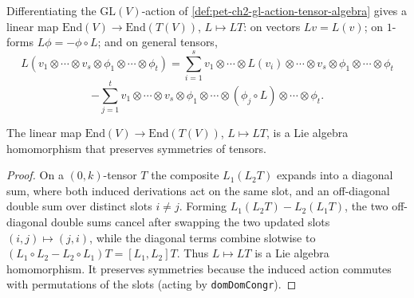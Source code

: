 \begin{definition}
  \label{def:pet-ch2-endomorphism-derivation}
  \leanok
  Differentiating the $\mathrm{GL}(V)$-action of
  \cref{def:pet-ch2-gl-action-tensor-algebra} gives a linear map
  $\mathrm{End}(V)\to\mathrm{End}(T(V))$, $L\mapsto LT$: on vectors $Lv=L(v)$;
  on $1$-forms $L\phi=-\phi\circ L$; and on general tensors,
  \[
    L(v_1\otimes\cdots\otimes v_s\otimes\phi_1\otimes\cdots\otimes\phi_t)
    = \sum_{i=1}^sv_1\otimes\cdots\otimes L(v_i)\otimes\cdots\otimes v_s\otimes\phi_1\otimes\cdots\otimes\phi_t
  \]
  \[
    -\sum_{j=1}^tv_1\otimes\cdots\otimes v_s\otimes\phi_1\otimes\cdots\otimes(\phi_j\circ L)\otimes\cdots\otimes\phi_t.
  \]
\end{definition}

\begin{proposition}
  \label{prop:pet-ch2-endomorphism-lie-algebra-hom}
  \leanok
  The linear map $\mathrm{End}(V)\to\mathrm{End}(T(V))$, $L\mapsto LT$, is a
  Lie algebra homomorphism that preserves symmetries of tensors.
\end{proposition}
\begin{proof}
  \leanok
  On a $(0,k)$-tensor $T$ the composite $L_1(L_2T)$ expands into a diagonal sum,
  where both induced derivations act on the same slot, and an off-diagonal double
  sum over distinct slots $i\neq j$. Forming $L_1(L_2T)-L_2(L_1T)$, the two
  off-diagonal double sums cancel after swapping the two updated slots
  $(i,j)\mapsto(j,i)$, while the diagonal terms combine slotwise to
  $(L_1\circ L_2-L_2\circ L_1)T=[L_1,L_2]T$. Thus $L\mapsto LT$ is a Lie algebra
  homomorphism. It preserves symmetries because the induced action commutes with
  permutations of the slots (acting by \texttt{domDomCongr}).
\end{proof}

